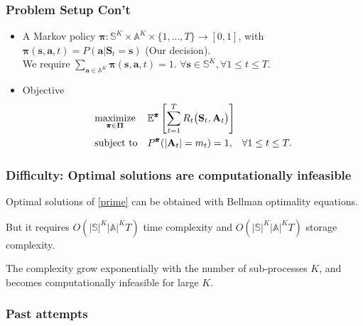 \documentclass{beamer}
\newcommand{\av}{\mathbf{a}}
\newcommand{\allp}{\pmb{\pi}}
\newcommand{\allpset}{\mathbf{\Pi}}
\newcommand{\allstates}{\mathbb{S}^K}
\newcommand{\allstate}{\mathbf{s}}
\newcommand{\allstater}{\mathbf{S}}
\newcommand{\allactions}{\mathbb{A}^K}
\newcommand{\allaction}{\av}
\newcommand{\allar}{\mathbf{A}}
\newcommand{\allr}{R}
\newcommand{\substates}{\mathbb{S}}
\newcommand{\subactions}{\mathbb{A}}
\begin{document}
\begin{frame}
\frametitle{Problem Setup Con't}
\begin{itemize}
\item A Markov policy $\allp:\allstates\times \allactions \times \{1,...,T\} \rightarrow [0,1]$, with $\allp(\allstate,\allaction,t) = P(\allaction|\allstater_t=\allstate)$ (Our decision).\\ We require $\sum_{\allaction\in\allactions}\allp(\allstate,\allaction,t)=1$.
$\forall \allstate\in\allstates, \forall 1\leq t\leq T$.
\item Objective
\begin{equation}\label{prime}
\begin{aligned}
& \underset{\allp\in\allpset}{\text{maximize}}
& & \mathbb{E}^{\allp}\left[\sum_{t=1}^{T}\allr_t\big(\allstater_t,\allar_t\big)\right] \\
& \text{subject to}
& & P^{\allp}(|\allar_t|=m_t)=1, \hspace{3mm}\forall 1\leq t\leq T .
\end{aligned}
\end{equation}
\end{itemize}
\end{frame}

\begin{frame}
\frametitle{Difficulty: Optimal solutions are computationally infeasible}
Optimal solutions of \eqref{prime} can be obtained with Bellman optimality equations.

\vspace{0.5cm}
But it requires $O(|\substates|^K|\subactions|^KT)$ time complexity and $O(|\substates|^K|\subactions|^KT)$ storage complexity.

\vspace{0.5cm}
The complexity grow exponentially with the number of sub-processes $K$, and becomes computationally infeasible for large $K$.
\end{frame}

\begin{frame}
\frametitle{Past attempts}
\end{frame}
\end{document}
